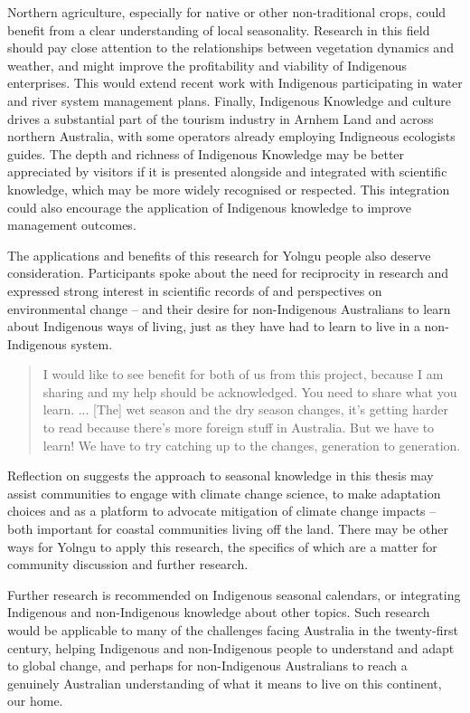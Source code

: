 Northern agriculture, especially for native or other non-traditional crops,
could benefit from a clear understanding of local seasonality.  Research in
this field should pay close attention to the relationships between vegetation
dynamics and weather, and might improve the profitability and viability of Indigenous
enterprises.  This would extend recent work \citep[eg.][]{jackson2012,jackson2015}
with Indigenous participating in water and river system management plans.
%
Finally, Indigenous Knowledge and culture drives a substantial part of the
tourism industry in Arnhem Land and across northern Australia, with some
operators already employing Indigneous ecologists guides.  The depth and
richness of Indigenous Knowledge may be better appreciated by visitors if
it is presented alongside and integrated with scientific knowledge, which
may be more widely recognised or respected.  This integration could also
encourage the application of Indigenous knowledge to improve management outcomes.


The applications and benefits of this research for Yolngu people also deserve
consideration.  Participants spoke about the need for reciprocity in research
and expressed strong interest in scientific records of and perspectives on
environmental change -- and their desire for non-Indigenous Australians to
learn about Indigenous ways of living, just as they have had to learn to
live in a non-Indigenous system.
\begin{quote}
    I would like to see benefit for both of us from this project, because I am
    sharing and my help should be acknowledged.  You need to share what you learn. ...
    [The] wet season and the dry season changes, it's getting harder to read
    because there's more foreign stuff in Australia.  But we have to learn!
    We have to try catching up to the changes, generation to generation.
\end{quote}
Reflection on \citet{petheram2010} suggests the approach to seasonal knowledge in this thesis
may assist communities to engage with climate change science, to make
adaptation choices and as a platform to advocate mitigation of climate change impacts -- both
important for coastal communities living off the land.  There may be other
ways for Yolngu to apply this research, the specifics of which are a matter for
community discussion and further research.


Further research is recommended on Indigenous seasonal calendars, or
integrating Indigenous and non-Indigenous knowledge about other topics.  Such
research would be applicable to many of the challenges facing
Australia in the twenty-first century, helping Indigenous and non-Indigenous
people to understand and adapt to global change, and perhaps for non-Indigenous
Australians to reach a genuinely Australian understanding of what it means to
live on this continent, our home.

